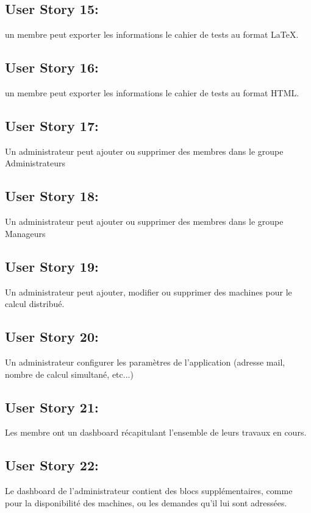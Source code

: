 	\subsection{User Story 15:}
	un membre peut exporter les informations le cahier de tests au format \LaTeX{}.
		
	\subsection{User Story 16:}
	un membre peut exporter les informations le cahier de tests au format HTML.
		
	\subsection{User Story 17:}
	Un administrateur peut ajouter ou supprimer des membres dans le groupe Administrateurs 
	
	\subsection{User Story 18:}
	Un administrateur peut ajouter ou supprimer des membres dans le groupe Manageurs
	
	\subsection{User Story 19:}
	Un administrateur peut ajouter, modifier ou supprimer des machines pour le calcul distribué.
		
	\subsection{User Story 20:}
	Un administrateur configurer les paramètres de l'application (adresse mail, nombre de calcul simultané, etc...)
		
	\subsection{User Story 21:}
	Les membre ont un dashboard récapitulant l'ensemble de leurs travaux en cours.
	
	\subsection{User Story 22:}
	Le dashboard de l'administrateur contient des blocs supplémentaires, comme pour la disponibilité des machines,
	ou les demandes qu'il lui sont adressées.
		
